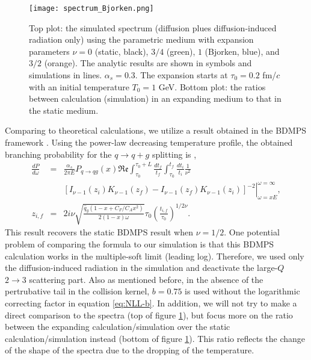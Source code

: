 \begin{figure}
\centering
\texttt{[image: spectrum\_Bjorken.png]}
\caption{Top plot: the simulated spectrum (diffusion plues diffusion-induced radiation only) using the parametric medium with expansion parameters $\nu = 0$ (static, black), $3/4$ (green), $1$ (Bjorken, blue), and $3/2$ (orange). The analytic results are shown in symbols and simulations in lines. $\alpha_s=0.3$. The expansion starts at $\tau_0 = 0.2$ fm/$c$ with an initial temperature $T_0 = 1$ GeV. Bottom plot: the ratios between calculation (simulation) in an expanding medium to that in the static medium.}
\label{fig:Bjorken-BDMPS}
\end{figure}

Comparing to theoretical calculations, we utilize a result obtained in the BDMPS framework \cite{Baier:1996kr,Baier:1998yf}.
Using the power-law decreasing temperature profile, the obtained branching probability for the $q\rightarrow q+g$ splitting is \cite{Baier:1998yf},
\begin{eqnarray}
\frac{dP}{d\omega} &=& \frac{\alpha_s}{2\pi E}P_{q\rightarrow qg}(x)\mathfrak{Re}\int_{\tau_0}^{\tau_0+L}\frac{dt_f}{t_f}\int_{\tau_0}^{t_f}\frac{dt_i}{t_i} \frac{1}{\nu^2}\\
\nonumber
&& \left.\left[ I_{\nu-1}(z_i)K_{\nu-1}(z_f)-I_{\nu-1}(z_f)K_{\nu-1}(z_i)\right]^{-2}\right|_{\omega=xE}^{\omega=\infty},\\
z_{i,f} &=& 2i\nu \sqrt{\frac{\hat{q}_g(1-x+C_F/C_A x^2)}{2(1-x)\omega}} \tau_0 \left( \frac{t_{i,f}}{\tau_0}\right) ^{1/2\nu}.
\end{eqnarray}
This result recovers the static BDMPS result \cite{Baier:1996kr} when $\nu=1/2$.
One potential problem of comparing the formula to our simulation is that this BDMPS calculation works in the multiple-soft limit (leading log).
Therefore, we used only the diffusion-induced radiation in the simulation and deactivate the large-$Q$ $2\rightarrow 3$ scattering part.
Also as mentioned before, in the absence of the pertrubative tail in the collision kernel, $b=0.75$ is used without the logarithmic correcting factor in equation \ref{eq:NLL-b}.
In addition, we will not try to make a direct comparison to the spectra (top of figure \ref{fig:Bjorken-BDMPS}), but focus more on the ratio between the expanding calculation/simulation over the static calculation/simulation instead (bottom of figure \ref{fig:Bjorken-BDMPS}).
This ratio reflects the change of the shape of the spectra due to the dropping of the temperature.

